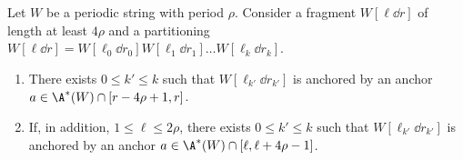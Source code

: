 \begin{lemma}\label{lm:anchors_catch_partial_match}
Let $W$ be a periodic string with period $\rho$. Consider a fragment $W[\ell \dd r]$ of length at least $4 \rho$ and a partitioning $W[\ell \dd r] = W[\ell_0 \dd r_0] W[\ell_1 \dd r_1] \ldots W[\ell_k \dd r_k]$. 
\begin{enumerate}[label=\textrm{(\alph*)}]
\item There exists $0 \le k' \le k$ such that $W[\ell_{k'} \dd r_{k'}]$ is anchored by an anchor $a \in \A^\ast(W) \cap [r-4\rho+1, r]$.\label{it:anchor_gen}
\item If, in addition, $1 \le \ell \le 2 \rho$, there exists $0 \le k' \le k$ such that $W[\ell_{k'} \dd r_{k'}]$ is anchored by an anchor $a \in \A^\ast(W) \cap [\ell, \ell + 4\rho-1]$.\label{it:anchor_beg}
\end{enumerate}
\end{lemma}
